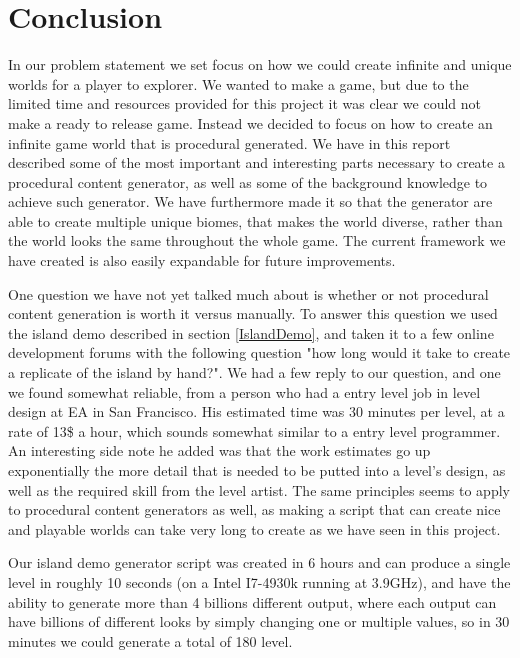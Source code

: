 \chapter{Conclusion}
\label{cha:Conclusion}
In our problem statement we set focus on how we could create infinite and unique worlds for a player to explorer. We wanted to make a game, but due to the limited time and resources provided for this project it was clear we could not make a ready to release game. Instead we decided to focus on how to create an infinite game world that is procedural generated. We have in this report described some of the most important and interesting parts necessary to create a procedural content generator, as well as some of the background knowledge to achieve such generator. We have furthermore made it so that the generator are able to create multiple unique biomes, that makes the world diverse, rather than the world looks the same throughout the whole game. The current framework we have created is also easily expandable for future improvements.

One question we have not yet talked much about is whether or not procedural content generation is worth it versus manually. To answer this question we used the island demo described in section \ref{IslandDemo}, and taken it to a few online development forums with the following question "how long would it take to create a replicate of the island by hand?". We had a few reply to our question, and one we found somewhat reliable, from a person who had a entry level job in level design at EA in San Francisco. His estimated time was 30 minutes per level, at a rate of 13\$ a hour, which sounds somewhat similar to a entry level programmer. An interesting side note he added was that the work estimates go up exponentially the more detail that is needed to be putted into a level's design, as well as the required skill from the level artist. The same principles seems to apply to procedural content generators as well, as making a script that can create nice and playable worlds can take very long to create as we have seen in this project.

Our island demo generator script was created in 6 hours and can produce a single level in roughly 10 seconds (on a Intel I7-4930k running at 3.9GHz), and have the ability to generate more than 4 billions different output, where each output can have billions of different looks by simply changing one or multiple values, so in 30 minutes we could generate a total of 180 level. 

